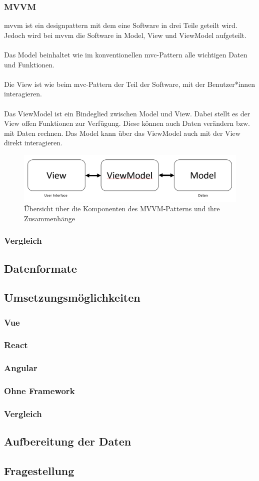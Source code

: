 \subsubsection{MVVM}
\Gls{mvvm} ist ein \Gls{designpattern} mit dem eine Software in drei Teile geteilt wird. Jedoch wird bei \Gls{mvvm} die Software in Model, View und ViewModel aufgeteilt.\\\\
Das Model beinhaltet wie im konventionellen \Gls{mvc}-Pattern alle wichtigen Daten und Funktionen.\\\\
Die View ist wie beim \Gls{mvc}-Pattern der Teil der Software, mit der Benutzer*innen interagieren.\\\\
Das ViewModel ist ein Bindeglied zwischen Model und View. Dabei stellt es der View offen Funktionen zur Verfügung. Diese können auch Daten verändern bzw. mit Daten rechnen. Das Model kann über das ViewModel auch mit der View direkt interagieren.\cite{mvvm_vue}
\begin{figure}[H]
	\centering
	\includegraphics[width=0.8\linewidth]{images/mvvm}
	\caption[Übersicht des MVVM-Patterns]{Übersicht über die Komponenten des MVVM-Patterns und ihre Zusammenhänge}
	\label{fig:mvc}
\end{figure}
\subsubsection{Vergleich}
\subsection{Datenformate}
\subsection{Umsetzungsmöglichkeiten}
\subsubsection{Vue}
\subsubsection{React}
\subsubsection{Angular}
\subsubsection{Ohne Framework}
\subsubsection{Vergleich}
\subsection{Aufbereitung der Daten}
\subsection{Fragestellung}
